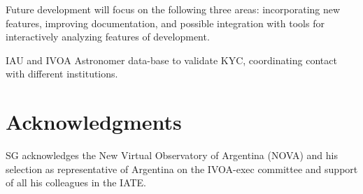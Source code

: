 \documentclass[final,5p,times,twocolumn,authoryear]{elsarticle}
\begin{document}
Future development will focus on the following three areas: incorporating
new features, improving documentation, and 
possible integration with tools for interactively analyzing features of development.

IAU and IVOA Astronomer data-base to validate KYC, coordinating contact with different institutions. 

\section{Acknowledgments}
SG acknowledges the New Virtual Observatory of Argentina (NOVA) and his selection as representative of Argentina on the IVOA-exec committee and support of all his colleagues in the IATE.

%


\end{document}
